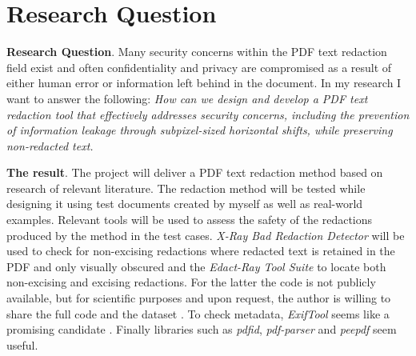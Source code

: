 \section{Research Question}

\textbf{Research Question}. Many security concerns within the PDF text redaction field exist and often confidentiality and privacy are compromised as a result of either human error or information left behind in the document. In my research I want to answer the following: \textit{How can we design and develop a PDF text redaction tool that effectively addresses security concerns, including the prevention of information leakage through subpixel-sized horizontal shifts, while preserving non-redacted text.} 

\textbf{The result}. The project will deliver a PDF text redaction method based on research of relevant literature. The redaction method will be tested while designing it using test documents created by myself as well as real-world examples. Relevant tools will be used to assess the safety of the redactions produced by the method in the test cases. \textit{X-Ray Bad Redaction Detector}\cite{Xray2021} will be used to check for non-excising redactions where redacted text is retained in the PDF and only visually obscured and the \textit{Edact-Ray Tool Suite}\cite{bland2022story} to locate both non-excising and excising redactions. For the latter the code is not publicly available, but for scientific purposes and upon request, the author is willing to share the full code and the dataset \cite{MaxellCode2021}. To check metadata, \textit{ExifTool} seems like a promising candidate \cite{ExitfoolHarvey}. Finally libraries such as \textit{pdfid}, \textit{pdf-parser} and \textit{peepdf} seem useful.